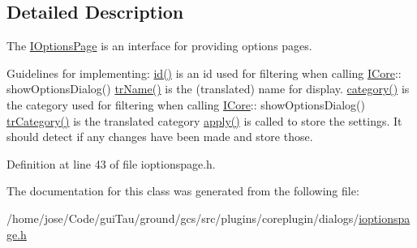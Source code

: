 \subsection{Detailed Description}
The \hyperlink{class_core_1_1_i_options_page}{I\-Options\-Page} is an interface for providing options pages. 

Guidelines for implementing\-:   \hyperlink{group___core_plugin_ga2984fb6ab0e3b502783dfee7ba596268}{id()} is an id used for filtering when calling \hyperlink{class_core_1_1_i_core}{I\-Core}\-:\-: show\-Options\-Dialog()  \hyperlink{group___core_plugin_ga9bda94026b37720a30f4294560c79244}{tr\-Name()} is the (translated) name for display.  \hyperlink{group___core_plugin_ga03767437394cdfbfc9e253638a71b132}{category()} is the category used for filtering when calling \hyperlink{class_core_1_1_i_core}{I\-Core}\-:\-: show\-Options\-Dialog()  \hyperlink{group___core_plugin_gac5538fc040c826784167edb4fc359b68}{tr\-Category()} is the translated category  \hyperlink{group___core_plugin_ga05fa0c9b91da02a0f2fed11d2d6afed0}{apply()} is called to store the settings. It should detect if any changes have been made and store those.  

Definition at line 43 of file ioptionspage.\-h.



The documentation for this class was generated from the following file\-:\begin{DoxyCompactItemize}
\item 
/home/jose/\-Code/gui\-Tau/ground/gcs/src/plugins/coreplugin/dialogs/\hyperlink{ioptionspage_8h}{ioptionspage.\-h}\end{DoxyCompactItemize}
